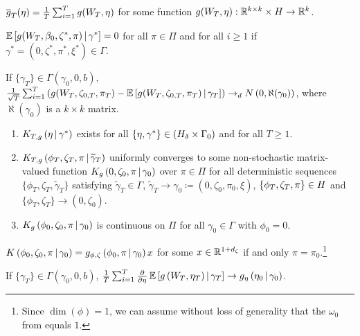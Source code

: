 \documentclass[11pt, letterpaper, twoside, final]{article}
\begin{document}
\begin{appendices}
    
    \begin{assump}[GMM 3]\label{ass:GMM3}
    \begin{assumplist}
        \item $\overline{g}_T(\eta) = \frac{1}{T} \sum_{i=1}^T g(W_T, \eta)$  for some function $g(W_T,
            \eta) : \mathbb{R}^{k \times k} \times H \to \mathbb{R}^k$.
            \label{ass:GMM3a}
        \item $\operatorname{\mathbb{E}}\left[g(W_T, \beta_0, \zeta^{*}, \pi) \,\middle\vert\, \gamma^{*} \right] = 0$ for all $\pi \in \Pi$ and
            for all $i \geq 1$ if $\gamma^{*} = \left(0,\zeta^{*}, \pi^{*}, \xi^{*} \right) \in \Gamma$.
            \label{ass:GMM3b}
        \item If $\{ \gamma_T \} \in \Gamma(\gamma_0, 0, b)$, $\frac{1}{\sqrt{T}} \sum_{i=1}^T \left(g(W_T,
            \zeta_{0,T}, \pi_T) - \operatorname{\mathbb{E}} \left[g(W_T, \zeta_{0,T}, \pi_T)\,\middle\vert\, \gamma_T \right]\right)  \to_d N\left(0,
            \aleph(\gamma_0)\right)$, where $\aleph(\gamma_0)$ is a $k \times k$ matrix.
            \label{ass:GMM3c}
        \item 
            \label{ass:GMM3d}
            \begin{enumerate}
                \item  $K_{T,g}\left(\eta \,\middle\vert\, \gamma^{*}\right)$ exists for all $\{\eta, \gamma^{*} \} \in
                    \left(H_{\delta} \times \Gamma_{0}\right)$ and for all $T \geq 1$.
                \item $K_{T,g}\left(\phi_T, \zeta_T, \pi \,\middle\vert\, \widetilde{\gamma}_T\right)$ uniformly converges
                    to some non-stochastic matrix-valued function  $K_{g}\left(0, \zeta_0, \pi \,\middle\vert\,
                    \gamma_0\right)$ over $\pi \in \Pi$ for all deterministic sequences $\{\phi_T, \zeta_T,
                    \widetilde{\gamma}_T \}$ satisfying $\widetilde{\gamma}_T \in \Gamma$, $\widetilde{\gamma}_T
                    \to \gamma_0 \coloneqq (0, \zeta_0, \pi_0, \xi)$, $\{\phi_T, \zeta_T, \pi \} \in H$ and
                    $\{\phi_T, \zeta_T \} \to (0, \zeta_0)$.
                \item $K_g\left(\phi_0, \zeta_0, \pi \,\middle\vert\, \gamma_0\right)$ is continuous on $\Pi$ for all
                    $\gamma_0 \in \Gamma$ with $\phi_0 = 0$.
            \end{enumerate}
            \item $K\left(\phi_0, \zeta_0, \pi \,\middle\vert\, \gamma_0\right) = g_{\phi, \zeta}\left(\phi_0,
                \pi\,\middle\vert\, \gamma_0\right) x$ for some $x \in \mathbb{R}^{1+d_{\zeta}}$ if and only $\pi =
                \pi_0$.\footnote{Since $\dim(\phi) = 1$, we can assume without loss of generality that the
                $\omega_0$ from \textcite{andrews2014Gmm} equals $1$.}
                \label{ass:GMM3e}
            \item If $\{ \gamma_T \} \in \Gamma(\gamma_0, 0, b)$, $\frac{1}{T} \sum_{i=1}^T
                \frac{\partial}{\partial \eta}  \operatorname{\mathbb{E}}\left[ g\left(W_T, \eta_T \right ) \,\middle\vert\, \gamma_T \right]
                \to g_{\eta}\left(\eta_0 \,\middle\vert\, \gamma_0\right)$.
            \label{ass:GMM3f}
    \end{assumplist}
    \end{assump}


\end{appendices}
\end{document}

